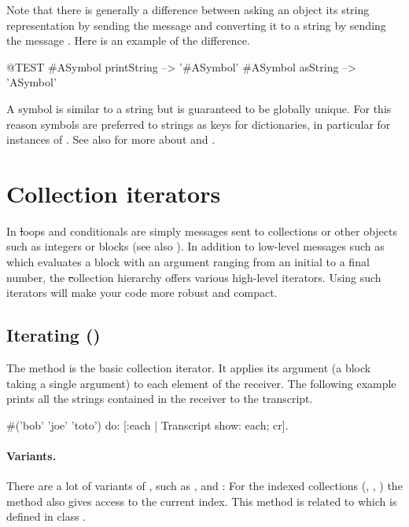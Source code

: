 \documentclass[a4paper,10pt,twoside]{book}
\begin{document}
Note that there is generally a difference between asking an object its string representation by sending the message  and converting it to a string by sending the message .
Here is an example of the difference.

\begin{code}{@TEST}
#ASymbol printString --> '#ASymbol'
#ASymbol asString    --> 'ASymbol'
\end{code}

A symbol is similar to a string but is guaranteed to be globally unique.  For this reason symbols are preferred to strings as keys for dictionaries, in particular for instances of .
See also  for more about  and .

\section{Collection iterators}

In \st loops and conditionals are simply messages sent to collections or other objects such as integers or blocks (see also ). In addition to low-level messages such as  which evaluates a block with an argument ranging from an initial to a final number, the \st collection hierarchy offers various high-level iterators. Using such iterators will make your code more robust and compact. 

\subsection{Iterating ()}
The method  is the basic collection iterator. It applies its argument (a block taking a single argument) to each element of the receiver.
The following example prints all the strings contained in the receiver to the transcript.

\begin{code}{}
#('bob' 'joe' 'toto') do: [:each | Transcript show: each; cr].
\end{code}

\paragraph{Variants.} There are a lot of variants of , such as \mbox{,} \mbox{} and :
For the indexed collections (, , ) the method  also gives access to the current index. This method is related to  which is defined in class .
\end{document}
